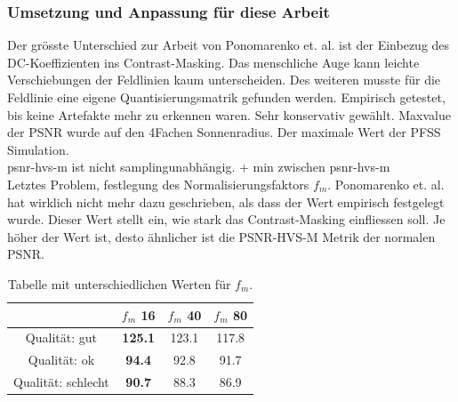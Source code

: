 \subsubsection{Umsetzung und Anpassung für diese Arbeit}
Der grösste Unterschied zur Arbeit von Ponomarenko et. al. ist der Einbezug des DC-Koeffizienten ins Contrast-Masking. Das menschliche Auge kann leichte Verschiebungen der Feldlinien kaum unterscheiden. Des weiteren musste für die Feldlinie eine eigene Quantisierungsmatrik  gefunden werden. Empirisch getestet, bis keine Artefakte mehr zu erkennen waren. Sehr konservativ gewählt.
Maxvalue der PSNR wurde auf den 4Fachen Sonnenradius. Der maximale Wert der PFSS Simulation.\\
psnr-hvs-m ist nicht samplingunabhängig. + min zwischen psnr-hvs-m \\
[\baselineskip]
Letztes Problem, festlegung des Normalisierungsfaktors $f_m$. Ponomarenko et. al. hat wirklich nicht mehr dazu geschrieben, als dass der Wert empirisch festgelegt wurde. Dieser Wert stellt ein, wie stark das Contrast-Masking einfliessen soll. Je höher der Wert ist, desto ähnlicher ist die PSNR-HVS-M Metrik der normalen PSNR.\\
\begin{table}
\center
\begin{tabular}{c|c|c|c}
	&$f_m$ 16 &$f_m$ 40 &$f_m$ 80 \\\hline
	Qualität: gut & \textbf{125.1}& 123.1 & 117.8 \\
	Qualität: ok & \textbf{94.4}& 92.8& 91.7\\
	Qualität: schlecht & \textbf{90.7} & 88.3 & 86.9
\end{tabular}
\caption{Tabelle mit unterschiedlichen Werten für $f_m$.}
\label{testsetup:psnr:umsetzung:tabelle:f_m}
\end{table}
